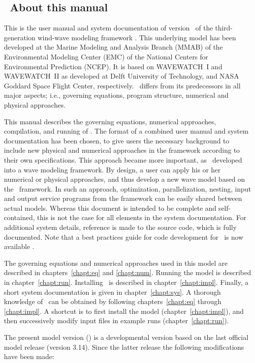 \vssub
\subsection{~About this manual}
\vssub

This is the user manual and system documentation of version \WWver\ of the
third-generation wind-wave modeling framework \ww. This underlying model has
been developed at the Marine Modeling and Analysis Branch (MMAB) of the
Environmental Modeling Center (EMC) of the National Centers for Environmental
Prediction (NCEP). It is based on WAVEWATCH~I and WAVEWATCH~II as developed at
Delft University of Technology, and NASA Goddard Space Flight Center,
respectively. \ws\ differs from its predecessors in all major aspects; i.e.,
governing equations, program structure, numerical and physical approaches.

This manual describes the governing equations, numerical approaches,
compilation, and running of \ws. The format of a combined user manual and
system documentation has been chosen, to give users the necessary background
to include new physical and numerical approaches in the framework according to
their own specifications.  This approach became more important, as \ws\
developed into a wave modeling framework. By design, a user can apply his or
her numerical or physical approaches, and thus develop a new wave model based
on the \ws\ framework. In such an approach, optimization, parallelization,
nesting, input and output service programs from the framework can be easily
shared between actual models.  Whereas this document is intended to be
complete and self-contained, this is not the case for all elements in the
system documentation. For additional system details, reference is made to the
source code, which is fully documented. Note that a best practices guide for
code development for \ws\ is now available \citep{tol:MMAB10a}.

The governing equations and numerical approaches used in this model are
described in chapters~\ref{chapt:eq} and \ref{chapt:num}. Running the model is
described in chapter~\ref{chapt:run}. Installing \ws\ is described in
chapter~\ref{chapt:impl}. Finally, a short system documentation is given in
chapter~\ref{chapt:sys}. A thorough knowledge of \ws\ can be obtained by
following chapters~\ref{chapt:eq} through \ref{chapt:impl}. A shortcut is to
first install the model (chapter~\ref{chapt:impl}), and then successively
modify input files in example runs (chapter~\ref{chapt:run}).

\vspace{\baselineskip} 
\noindent 
The present model version (\WWver) is a developmental version based on the
last official model release (version 3.14). Since the latter release the
following modifications have been made:

